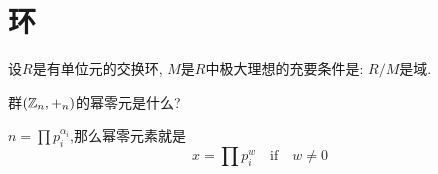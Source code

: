 \section{环}
\begin{theorem}
    设$R$是有单位元的交换环, $M$是$R$中极大理想的充要条件是: $R/M$是域.
\end{theorem}

群$(\mathbb{Z}_n,+_n)$的幂零元是什么?

$n = \prod p_i^{\alpha_i}$,那么幂零元素就是
$$
x = \prod p_i^{w} \quad \text{if} \quad w \ne 0
$$

